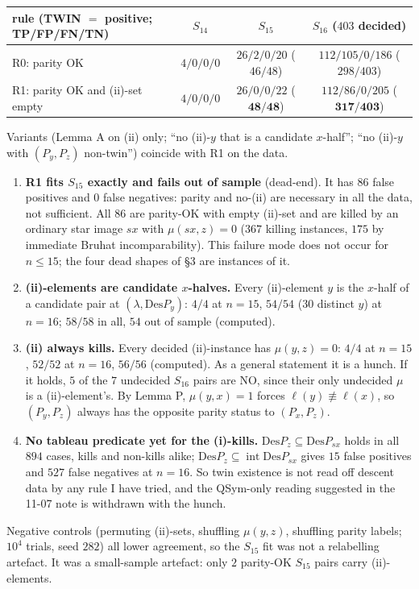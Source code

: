 \documentclass[11pt]{amsart}
\newcommand{\gr}[1]{\textsf{#1}}
\theoremstyle{definition}
\theoremstyle{remark}
\newcommand{\Des}{\mathrm{Des}}
\newcommand{\intr}{\operatorname{int}}
\begin{document}
\begin{center}\small
\begin{tabular}{@{}lccc@{}}\toprule
rule (TWIN $=$ positive; TP/FP/FN/TN) & $S_{14}$ & $S_{15}$ & $S_{16}$ ($403$ decided)\\\midrule
R0: parity OK & $4/0/0/0$ & $26/2/0/20$ ($46/48$) & $112/105/0/186$ ($298/403$)\\
R1: parity OK and (ii)-set empty & $4/0/0/0$ & $26/0/0/22$ ($\mathbf{48/48}$) & $112/86/0/205$ ($\mathbf{317/403}$)\\\bottomrule
\end{tabular}
\end{center}

Variants (Lemma A on (ii) only; ``no (ii)-$y$ that is a candidate $x$-half''; ``no (ii)-$y$ with $(P_y,P_z)$ non-twin'') coincide with R1 on the data.
\begin{enumerate}[leftmargin=*,itemsep=2pt]
\item \textbf{R1 fits $S_{15}$ exactly and fails out of sample} (\gr{dead-end}). It has $86$ false positives and $0$ false negatives: parity and no-(ii) are necessary in all the data, not sufficient. All $86$ are parity-OK with empty (ii)-set and are killed by an ordinary star image $sx$ with $\mu(sx,z)=0$ ($367$ killing instances, $175$ by immediate Bruhat incomparability). This failure mode does not occur for $n\le15$; the four dead shapes of \S3 are instances of it.
\item \textbf{(ii)-elements are candidate $x$-halves.} Every (ii)-element $y$ is the $x$-half of a candidate pair at $(\lambda,\Des P_y)$: $4/4$ at $n=15$, $54/54$ ($30$ distinct $y$) at $n=16$; $58/58$ in all, $54$ out of sample (\gr{computed}).
\item \textbf{(ii) always kills.} Every decided (ii)-instance has $\mu(y,z)=0$: $4/4$ at $n=15$, $52/52$ at $n=16$, $56/56$ (\gr{computed}). As a general statement it is a \gr{hunch}. If it holds, $5$ of the $7$ undecided $S_{16}$ pairs are NO, since their only undecided $\mu$ is a (ii)-element's. By Lemma P, $\mu(y,x)=1$ forces $\ell(y)\not\equiv\ell(x)$, so $(P_y,P_z)$ always has the opposite parity status to $(P_x,P_z)$.
\item \textbf{No tableau predicate yet for the (i)-kills.} $\Des P_z\subseteq\Des P_{sx}$ holds in all $894$ cases, kills and non-kills alike; $\Des P_z\subseteq\intr\Des P_{sx}$ gives $15$ false positives and $527$ false negatives at $n=16$. So twin existence is not read off descent data by any rule I have tried, and the QSym-only reading suggested in the 11-07 note is withdrawn with the hunch.
\end{enumerate}
Negative controls (permuting (ii)-sets, shuffling $\mu(y,z)$, shuffling parity labels; $10^4$ trials, seed $282$) all lower agreement, so the $S_{15}$ fit was not a relabelling artefact. It was a small-sample artefact: only $2$ parity-OK $S_{15}$ pairs carry (ii)-elements.
\end{document}
